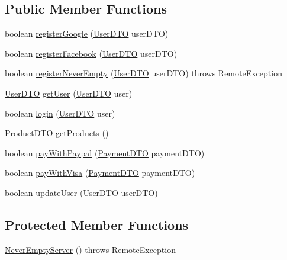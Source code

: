 \subsection*{Public Member Functions}
\begin{DoxyCompactItemize}
\item 
boolean \mbox{\hyperlink{class_s_p_q_1_1_never_empty_server_ac97355451c02fc378cb5d8f33f442ce6}{register\+Google}} (\mbox{\hyperlink{class_s_p_q_1_1dto_1_1_user_d_t_o}{User\+D\+TO}} user\+D\+TO)
\item 
boolean \mbox{\hyperlink{class_s_p_q_1_1_never_empty_server_abf7e271e0edb91e8f8ed73063de74b03}{register\+Facebook}} (\mbox{\hyperlink{class_s_p_q_1_1dto_1_1_user_d_t_o}{User\+D\+TO}} user\+D\+TO)
\item 
boolean \mbox{\hyperlink{class_s_p_q_1_1_never_empty_server_ae52815c925e04018d6a1b2742d605063}{register\+Never\+Empty}} (\mbox{\hyperlink{class_s_p_q_1_1dto_1_1_user_d_t_o}{User\+D\+TO}} user\+D\+TO)  throws Remote\+Exception 
\item 
\mbox{\hyperlink{class_s_p_q_1_1dto_1_1_user_d_t_o}{User\+D\+TO}} \mbox{\hyperlink{class_s_p_q_1_1_never_empty_server_abb18bd0d72ecb8790068f206c592c58d}{get\+User}} (\mbox{\hyperlink{class_s_p_q_1_1dto_1_1_user_d_t_o}{User\+D\+TO}} user)
\item 
boolean \mbox{\hyperlink{class_s_p_q_1_1_never_empty_server_a79e3b01cc25be204f24e01c7fccbef13}{login}} (\mbox{\hyperlink{class_s_p_q_1_1dto_1_1_user_d_t_o}{User\+D\+TO}} user)
\item 
\mbox{\hyperlink{class_s_p_q_1_1dto_1_1_product_d_t_o}{Product\+D\+TO}} \mbox{\hyperlink{class_s_p_q_1_1_never_empty_server_ad8c5a0afa259c6b8bcc2eb2444742ca2}{get\+Products}} ()
\item 
boolean \mbox{\hyperlink{class_s_p_q_1_1_never_empty_server_a954ea8c563055eae79564b357e557f85}{pay\+With\+Paypal}} (\mbox{\hyperlink{class_s_p_q_1_1dto_1_1_payment_d_t_o}{Payment\+D\+TO}} payment\+D\+TO)
\item 
boolean \mbox{\hyperlink{class_s_p_q_1_1_never_empty_server_a455fa773e66917007842f9a92243ffa8}{pay\+With\+Visa}} (\mbox{\hyperlink{class_s_p_q_1_1dto_1_1_payment_d_t_o}{Payment\+D\+TO}} payment\+D\+TO)
\item 
boolean \mbox{\hyperlink{class_s_p_q_1_1_never_empty_server_ad39f95ea2309841407f7e8b9e1b9f664}{update\+User}} (\mbox{\hyperlink{class_s_p_q_1_1dto_1_1_user_d_t_o}{User\+D\+TO}} user\+D\+TO)
\end{DoxyCompactItemize}
\subsection*{Protected Member Functions}
\begin{DoxyCompactItemize}
\item 
\mbox{\hyperlink{class_s_p_q_1_1_never_empty_server_a5cec4d4f1ec13bf31974d58182e82170}{Never\+Empty\+Server}} ()  throws Remote\+Exception 
\end{DoxyCompactItemize}


